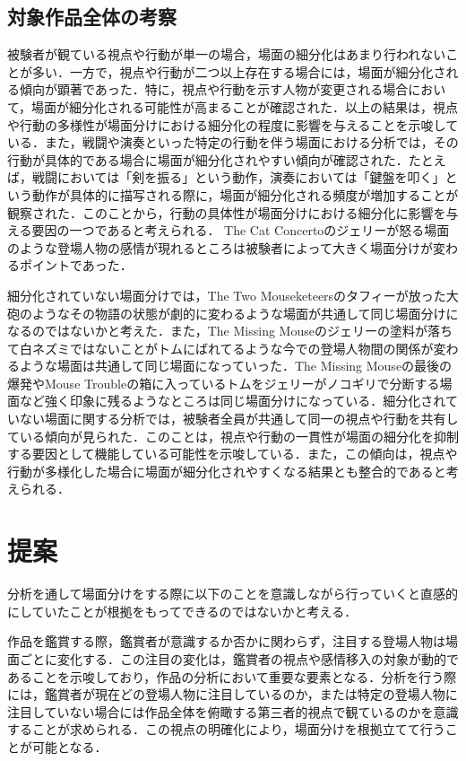\subsection{対象作品全体の考察}
被験者が観ている視点や行動が単一の場合，場面の細分化はあまり行われないことが多い．一方で，視点や行動が二つ以上存在する場合には，場面が細分化される傾向が顕著であった．特に，視点や行動を示す人物が変更される場合において，場面が細分化される可能性が高まることが確認された．以上の結果は，視点や行動の多様性が場面分けにおける細分化の程度に影響を与えることを示唆している．また，戦闘や演奏といった特定の行動を伴う場面における分析では，その行動が具体的である場合に場面が細分化されやすい傾向が確認された．たとえば，戦闘においては「剣を振る」という動作，演奏においては「鍵盤を叩く」という動作が具体的に描写される際に，場面が細分化される頻度が増加することが観察された．このことから，行動の具体性が場面分けにおける細分化に影響を与える要因の一つであると考えられる． The Cat Concertoのジェリーが怒る場面のような登場人物の感情が現れるところは被験者によって大きく場面分けが変わるポイントであった．

細分化されていない場面分けでは，The Two Mouseketeersのタフィーが放った大砲のようなその物語の状態が劇的に変わるような場面が共通して同じ場面分けになるのではないかと考えた．また，The Missing Mouseのジェリーの塗料が落ちて白ネズミではないことがトムにばれてるような今での登場人物間の関係が変わるような場面は共通して同じ場面になっていった．The Missing Mouseの最後の爆発やMouse Troubleの箱に入っているトムをジェリーがノコギリで分断する場面など強く印象に残るようなところは同じ場面分けになっている．細分化されていない場面に関する分析では，被験者全員が共通して同一の視点や行動を共有している傾向が見られた．このことは，視点や行動の一貫性が場面の細分化を抑制する要因として機能している可能性を示唆している．また，この傾向は，視点や行動が多様化した場合に場面が細分化されやすくなる結果とも整合的であると考えられる．

\section{提案}
分析を通して場面分けをする際に以下のことを意識しながら行っていくと直感的にしていたことが根拠をもってできるのではないかと考える．

作品を鑑賞する際，鑑賞者が意識するか否かに関わらず，注目する登場人物は場面ごとに変化する．この注目の変化は，鑑賞者の視点や感情移入の対象が動的であることを示唆しており，作品の分析において重要な要素となる．分析を行う際には，鑑賞者が現在どの登場人物に注目しているのか，または特定の登場人物に注目していない場合には作品全体を俯瞰する第三者的視点で観ているのかを意識することが求められる．この視点の明確化により，場面分けを根拠立てて行うことが可能となる．

